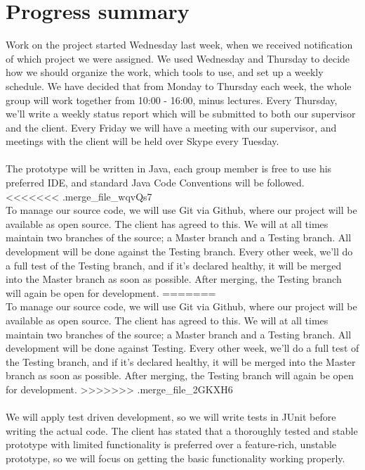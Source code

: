 \documentclass[titlepage]{article}
\begin{document}
    \section*{Progress summary}
        Work on the project started Wednesday last week, when we received notification of which project we were assigned. We used Wednesday and Thursday to decide how we should organize the work, which tools to use, and set up a weekly schedule.
We have decided that from Monday to Thursday each week, the whole group will work together from 10:00 - 16:00, minus lectures. Every Thursday, we'll write a weekly status report which will be submitted to both our supervisor and the client. Every Friday we will have a meeting with our supervisor, and meetings with the client will be held over Skype every Tuesday.
\\\\
        The prototype will be written in Java, each group member is free to use his preferred IDE, and standard Java Code Conventions will be followed. 
<<<<<<< .merge_file_wqvQs7
\\To manage our source code, we will use Git via Github, where our project will be available as open source. The client has agreed to this. We will at all times maintain two branches of the source; a Master branch and a Testing branch. All development will be done against the Testing branch. Every other week, we'll do a full test of the Testing branch, and if it's declared healthy, it will be merged into the Master branch as soon as possible. After merging, the Testing branch will again be open for development.
=======
\\To manage our source code, we will use Git via Github, where our project will be available as open source. The client has agreed to this. We will at all times maintain two branches of the source; a Master branch and a Testing branch. All development will be done against Testing. Every other week, we'll do a full test of the Testing branch, and if it's declared healthy, it will be merged into the Master branch as soon as possible. After merging, the Testing branch will again be open for development.
>>>>>>> .merge_file_2GKXH6
\\\\
        We will apply test driven development, so we will write tests in JUnit before writing the actual code. The client has stated that a thoroughly tested and stable prototype with limited functionality is preferred over a feature-rich, unstable prototype, so we will focus on getting the basic functionality working properly.
\end{document}
